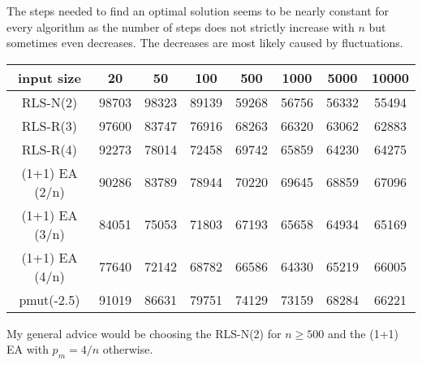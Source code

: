 The steps needed to find an optimal solution seems to be nearly constant for every algorithm as the number of steps does not strictly increase with $n$ but sometimes even decreases.
The decreases are most likely caused by fluctuations.

\begin{tabular}[h]{cccccccc}
      input size    & 20    & 50    & 100   & 500   & 1000  & 5000  & 10000 \\\hline
      RLS-N(2)      & 98703 & 98323 & 89139 & 59268 & 56756 & 56332 & 55494 \\
      RLS-R(3)      & 97600 & 83747 & 76916 & 68263 & 66320 & 63062 & 62883 \\
      RLS-R(4)      & 92273 & 78014 & 72458 & 69742 & 65859 & 64230 & 64275 \\
      (1+1) EA (2/n) & 90286 & 83789 & 78944 & 70220 & 69645 & 68859 & 67096 \\
      (1+1) EA (3/n) & 84051 & 75053 & 71803 & 67193 & 65658 & 64934 & 65169 \\
      (1+1) EA (4/n) & 77640 & 72142 & 68782 & 66586 & 64330 & 65219 & 66005 \\
      pmut(-2.5)    & 91019 & 86631 & 79751 & 74129 & 73159 & 68284 & 66221 \\
\end{tabular}

My general advice would be choosing the RLS-N(2) for $n\ge500$ and the (1+1) EA with $p_m=4/n$ otherwise.